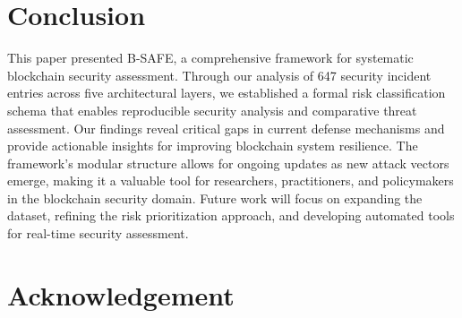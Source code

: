\documentclass[a4paper]{article}
\begin{document}
\begin{multicols}{2}
\section{Conclusion}
This paper presented B-SAFE, a comprehensive framework for systematic blockchain security assessment. Through our analysis of 647 security incident entries across five architectural layers, we established a formal risk classification schema that enables reproducible security analysis and comparative threat assessment. Our findings reveal critical gaps in current defense mechanisms and provide actionable insights for improving blockchain system resilience. The framework's modular structure allows for ongoing updates as new attack vectors emerge, making it a valuable tool for researchers, practitioners, and policymakers in the blockchain security domain. Future work will focus on expanding the dataset, refining the risk prioritization approach, and developing automated tools for real-time security assessment. 

\section*{Acknowledgement}


\nocite{ChenYao2022,Deloitte2000,Scribbr2020,SlatWorp2019,SlatWorpHolierhoekND,Launiainen2018,Karatas2021,MarahChallenger2023}


\end{multicols}
\end{document}
